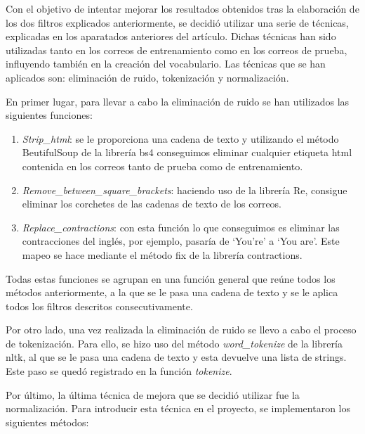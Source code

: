 \documentclass[conference,a4paper]{IEEEtran}
\begin{document}
Con el objetivo de intentar mejorar los resultados obtenidos tras la elaboración de los dos filtros explicados anteriormente, se decidió utilizar una serie de técnicas, explicadas en los aparatados anteriores del artículo. Dichas técnicas han sido utilizadas tanto en los correos de entrenamiento como en los correos de prueba, influyendo también en la creación del vocabulario. Las técnicas que se han aplicados son: eliminación de ruido, tokenización y normalización.

En primer lugar, para llevar a cabo la eliminación de ruido se han utilizados las siguientes funciones: 

\begin{enumerate}

\item \textit{Strip\_html}: se le proporciona una cadena de texto y utilizando el método BeutifulSoup de la librería bs4 conseguimos eliminar cualquier etiqueta html contenida en los correos tanto de prueba como de entrenamiento.

\item \textit{Remove\_between\_square\_brackets}: haciendo uso de la librería Re, consigue eliminar los corchetes de las cadenas de texto de los correos.

\item \textit{Replace\_contractions}: con esta función lo que conseguimos es eliminar las contracciones del inglés, por ejemplo, pasaría de ‘You’re’ a ‘You are’. Este mapeo se hace mediante el método fix de la librería contractions.

\end{enumerate}

Todas estas funciones se agrupan en una función general que reúne todos los métodos anteriormente, a la que se le pasa una cadena de texto y se le aplica todos los filtros descritos consecutivamente.

   
Por otro lado, una vez realizada la eliminación de ruido se llevo a cabo el proceso de tokenización. Para ello, se hizo uso del método \textit{word\_tokenize} de la librería nltk, al que se le pasa una cadena de texto y esta devuelve una lista de strings. Este paso se quedó registrado en la función \textit{tokenize}.

Por último, la última técnica de mejora que se decidió utilizar fue la normalización. Para introducir esta técnica en el proyecto, se implementaron los siguientes métodos:
\end{document}
